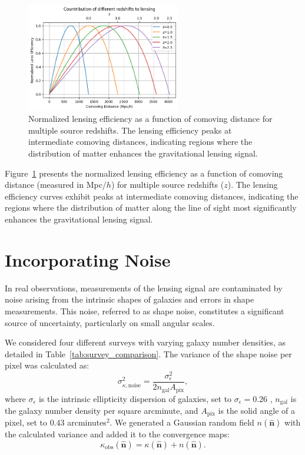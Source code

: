 \begin{figure}
    \centering
    \includegraphics[width=0.6\textwidth]{figures/lensefficiency.png}
    \caption{Normalized lensing efficiency as a function of comoving distance for multiple source redshifts. The lensing efficiency peaks at intermediate comoving distances, indicating regions where the distribution of matter enhances the gravitational lensing signal.} \label{fig:lensing_efficiency}
\end{figure}
Figure~\ref{fig:lensing_efficiency} presents the normalized lensing efficiency as a function of comoving distance (measured in Mpc/$h$) for multiple source redshifts ($z$). The lensing efficiency curves exhibit peaks at intermediate comoving distances, indicating the regions where the distribution of matter along the line of sight most significantly enhances the gravitational lensing signal. 

\section{Incorporating Noise}
In real observations, measurements of the lensing signal are contaminated by noise arising from the intrinsic shapes of galaxies and errors in shape measurements. This noise, referred to as shape noise, constitutes a significant source of uncertainty, particularly on small angular scales.

We considered four different surveys with varying galaxy number densities, as detailed in Table~\ref{tab:survey_comparison}.
The variance of the shape noise per pixel was calculated as:
\begin{equation}
    \sigma_{\kappa, \text{noise}}^2 = \frac{\sigma_{\epsilon}^2}{2 n_{\mathrm{gal}} A_{\mathrm{pix}}},
\end{equation}
where $\sigma_{\epsilon}$ is the intrinsic ellipticity dispersion of galaxies, set to $\sigma_{\epsilon} = 0.26$ \citep{2019A&A...627A..59E}, $n_{\mathrm{gal}}$ is the galaxy number density per square arcminute, and $A_{\mathrm{pix}}$ is the solid angle of a pixel, set to $0.43$ arcminutes$^2$.
We generated a Gaussian random field $n(\hat{\mathbf{n}})$ with the calculated variance and added it to the convergence maps:
\begin{equation}
    \kappa_{\mathrm{obs}}(\hat{\mathbf{n}}) = \kappa(\hat{\mathbf{n}}) + n(\hat{\mathbf{n}}).
\end{equation}

